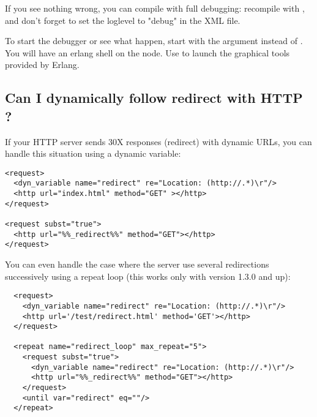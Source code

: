 \documentclass{TSUNG-en}
\begin{document}
\begin{appendix}
If you see nothing wrong, you can compile  with full
debugging: recompile with  , and
don't forget to set the loglevel to "debug" in the XML file.

To start the debugger or see what happen, start  with the
 argument instead of . You will have
an erlang shell on the  node. Use
 to launch the graphical tools provided by
Erlang.

\subsection{Can I dynamically follow redirect with HTTP ?}

If your HTTP server sends 30X responses (redirect) with dynamic URLs,
you can handle this situation using a dynamic variable:

\begin{Verbatim}
<request>
  <dyn_variable name="redirect" re="Location: (http://.*)\r"/>
  <http url="index.html" method="GET" ></http>
</request>

<request subst="true">
  <http url="%%_redirect%%" method="GET"></http>
</request>
\end{Verbatim}

You can even handle the case where the server use several redirections
successively using a repeat loop (this works only with version 1.3.0 and up):

\begin{Verbatim}
  <request>
    <dyn_variable name="redirect" re="Location: (http://.*)\r"/>
    <http url='/test/redirect.html' method='GET'></http>
  </request>

  <repeat name="redirect_loop" max_repeat="5">
    <request subst="true">
      <dyn_variable name="redirect" re="Location: (http://.*)\r"/>
      <http url="%%_redirect%%" method="GET"></http>
    </request>
    <until var="redirect" eq=""/>
  </repeat>
\end{Verbatim}


\end{appendix}
\end{document}
